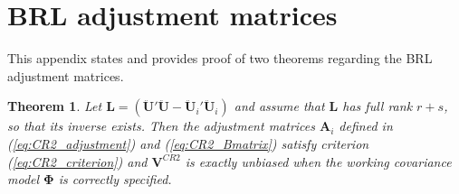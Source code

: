\documentclass[12pt]{article}\usepackage[]{graphicx}\usepackage[]{color}
\newtheorem{thm}{Theorem}
\newcommand{\bm}{\mathbf}
\newcommand{\bs}{\boldsymbol}
\begin{document}
\appendix

\section{BRL adjustment matrices}
\label{app:theorems}

This appendix states and provides proof of two theorems regarding the BRL adjustment matrices. 

\begin{thm}
\label{thm:BRL_FE}
Let $\bm{L} = \left(\bm{\ddot{U}}'\bm{\ddot{U}} - \bm{\ddot{U}}_i'\bm{\ddot{U}}_i\right)$ and assume that $\bm{L}$ has full rank $r + s$, so that its inverse exists. Then the adjustment matrices $\bm{A}_i$ defined in (\ref{eq:CR2_adjustment}) and (\ref{eq:CR2_Bmatrix}) satisfy criterion (\ref{eq:CR2_criterion}) and $\bm{V}^{CR2}$ is exactly unbiased when the working covariance model $\bs\Phi$ is correctly specified.
\end{thm}
\end{document}
